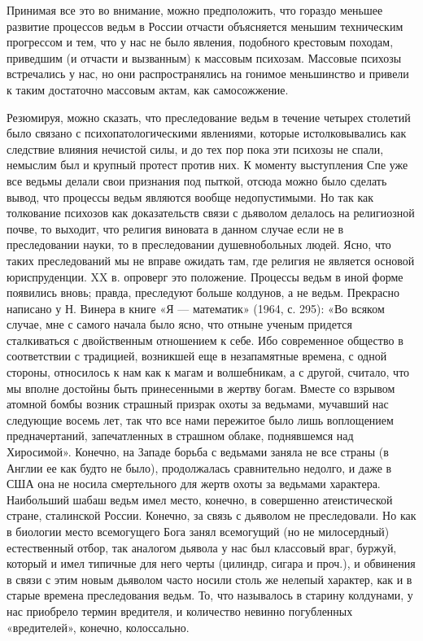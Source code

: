 Принимая все это во внимание, можно предположить, что гораздо меньшее развитие
процессов ведьм в России отчасти объясняется меньшим техническим прогрессом и
тем, что у нас не было явления, подобного крестовым походам, приведшим (и
отчасти и вызванным) к массовым психозам. Массовые психозы встречались у нас,
но они распространялись на гонимое меньшинство и привели к таким достаточно
массовым актам, как самосожжение.

Резюмируя, можно сказать, что преследование ведьм в течение четырех столетий
было связано с психопатологическими явлениями,
которые истолковывались как следствие влияния нечистой силы, и до тех пор пока
эти психозы не спали, немыслим был и крупный протест против них. К моменту
выступления Спе уже все ведьмы делали свои признания под пыткой, отсюда можно
было сделать вывод, что процессы ведьм являются вообще недопустимыми. Но так
как толкование психозов как доказательств связи с дьяволом делалось на
религиозной почве, то выходит, что религия виновата в данном случае если не в
преследовании науки, то в преследовании душевнобольных людей. Ясно, что таких
преследований мы не вправе ожидать там, где религия не является основой
юриспруденции. XX в. опроверг это положение. Процессы ведьм в иной форме
появились вновь; правда, преследуют больше колдунов, а не ведьм. Прекрасно
написано у Н. Винера в книге «Я --- математик» (1964, с. 295): «Во всяком случае,
мне с самого начала было ясно, что отныне ученым придется сталкиваться с
двойственным отношением к себе. Ибо современное общество в соответствии с
традицией, возникшей еще в незапамятные времена, с одной стороны, относилось к
нам как к магам и волшебникам, а с другой, считало, что мы вполне достойны быть
принесенными в жертву богам. Вместе со взрывом атомной бомбы возник страшный
призрак охоты за ведьмами, мучавший нас следующие восемь лет, так что все нами
пережитое было лишь воплощением предначертаний, запечатленных в страшном
облаке, поднявшемся над Хиросимой». Конечно, на Западе борьба с ведьмами заняла
не все страны (в Англии ее как будто не было), продолжалась сравнительно
недолго, и даже в США она не носила смертельного для жертв охоты за ведьмами
характера. Наибольший шабаш ведьм имел место, конечно, в совершенно
атеистической стране, сталинской России. Конечно, за связь с дьяволом не
преследовали. Но как в биологии место всемогущего Бога занял всемогущий (но не
милосердный) естественный отбор, так аналогом дьявола у нас был классовый враг,
буржуй, который и имел типичные для него черты (цилиндр, сигара и проч.), и
обвинения в связи с этим новым дьяволом часто носили столь же нелепый характер,
как и в старые времена преследования ведьм. То, что называлось в старину
колдунами, у нас приобрело термин вредителя, и количество невинно погубленных
«вредителей», конечно, колоссально.

